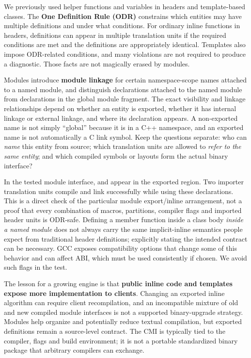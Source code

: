 \hypertarget{05-engine-i-ch006-inline-linkage-and-the-one-definition-rule-survive-the-transition-to-modules}{}

We previously used  helper functions and variables in headers and template-based classes. The \textbf{One Definition Rule (ODR)} constrains which entities may have multiple definitions and under what conditions. For ordinary inline functions in headers, definitions can appear in multiple translation units if the required conditions are met and the definitions are appropriately identical. Templates also impose ODR-related conditions, and many violations are not required to produce a diagnostic. Those facts are not magically erased by modules.

Modules introduce \textbf{module linkage} for certain namespace-scope names attached to a named module, and distinguish declarations attached to the named module from declarations in the global module fragment. The exact visibility and linkage relationships depend on whether an entity is exported, whether it has internal linkage or external linkage, and where its declaration appears. A non-exported name is not simply ``global'' because it is in a C++ namespace, and an exported name is not automatically a C link symbol. Keep the questions separate: who can \emph{name} this entity from source; which translation units are allowed to \emph{refer to the same entity}; and which compiled symbols or layouts form the actual binary interface?

In the tested module interface,  and  appear in the exported region. Two importer translation units compile and link successfully while using these declarations. This is a direct check of the particular module export/inline arrangement, not a proof that every combination of macros, partitions, compiler flags and imported header units is ODR-safe. Defining a member function inside a class body \emph{inside a named module} does not always carry the same implicit-inline semantics people expect from traditional header definitions; explicitly stating the intended  contract can be necessary. GCC exposes compatibility options that change some of this behavior and can affect ABI, which must be used consistently if chosen. We avoid such flags in the test.

The lesson for a growing engine is that \textbf{public inline code and templates expose more implementation to clients}. Changing an exported inline algorithm can require client recompilation, and an incompatible mixture of old and new compiled module interfaces is not a supported binary-upgrade strategy. Modules help organize and potentially reduce textual compilation, but exported definitions remain a source-level contract. The CMI is typically tied to the compiler, flags and build environment; it is not a portable standardized binary package that arbitrary compilers can exchange.

